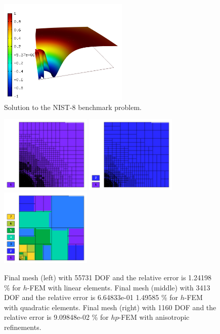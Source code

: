 \documentclass[12pt]{elsarticle}
\begin{document}
\begin{figure}[H]
\centering
\vspace{-3mm}
\includegraphics[height=5cm]{nist/nist-8/solution.png}
\vspace{-3mm}
\caption{Solution to the NIST-8 benchmark problem.}
\vspace{-4mm}
\label{fig:sln-nist08}
\end{figure}


\begin{figure}[H]
\centering
\includegraphics[height=3.7cm]{nist/nist-8/mesh_h1_aniso.png}
\includegraphics[height=3.7cm]{nist/nist-8/mesh_h2_aniso.png}
\includegraphics[height=3.7cm]{nist/nist-8/mesh_hp_aniso.png}
\caption{
Final mesh (left) with 55731 DOF and the relative error is 1.24198 \% for $h$-FEM with linear elements.
Final mesh (middle) with 3413 DOF and the relative error is 6.64833e-01 1.49585 \% for $h$-FEM with quadratic elements.
Final mesh (right) with 1160 DOF and the relative error is 9.09848e-02 \% for $hp$-FEM with anisotropic refinements.}
\label{fig:nist-8-hp-aniso}
\end{figure}
\end{document}
